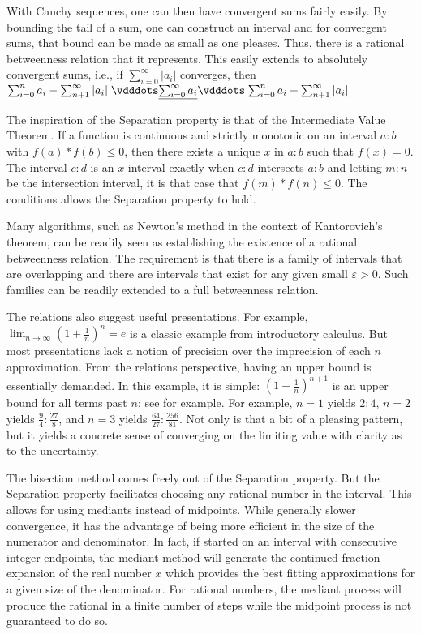 \documentclass[12pt]{article}
\begin{document}
With Cauchy sequences, one can then have convergent sums fairly easily. By bounding the tail of a sum, one can construct an interval and for convergent sums, that bound can be made as small as one pleases. Thus, there is a rational betweenness relation that it represents. This easily extends to absolutely convergent sums, i.e., if $ \sum_{i=0}^{\infty} |a_i|$ converges, then $\sum_{i=0}^n a_i - \sum_{n+1}^{\infty} |a_i| \xrel[\sum_{i=0}^{\infty} a_i] \sum_{i=0}^n a_i + \sum_{n+1}^{\infty} |a_i|$ 

The inspiration of the Separation property is that of the Intermediate Value Theorem. If a function is continuous and strictly monotonic on an interval $a:b$ with $f(a)*f(b) \leq 0$, then there exists a unique $x$ in $a:b$ such that $f(x) = 0$. The interval $c:d$ is an $x$-interval exactly when $c:d$ intersects $a:b$ and letting $m:n$ be the intersection interval, it is that case that $f(m)*f(n) \leq 0$. The conditions allows the Separation property to hold. 

Many algorithms, such as Newton's method in the context of Kantorovich's theorem, can be readily seen as establishing the existence of a rational betweenness relation. The requirement is that there is a family of intervals that are overlapping and there are intervals that exist for any given small $\varepsilon>0$. Such families can be readily extended to a full betweenness relation. 

The relations also suggest useful presentations. For example, $\lim_{n \to \infty} (1+\frac{1}{n})^n = e$ is a classic example from introductory calculus. But most presentations lack a notion of precision over the imprecision of each $n$ approximation. From the relations perspective, having an upper bound is essentially demanded. In this example, it is simple: $(1 + \frac{1}{n})^{n+1}$ is an upper bound for all terms past $n$; see \cite{mend} for example. For example, $n=1$ yields $2:4$, $n=2$ yields $\frac{9}{4}:\frac{27}{8}$, and $n=3$ yields $\frac{64}{27}:\frac{256}{81}$. Not only is that a bit of a pleasing pattern, but it yields a concrete sense of converging on the limiting  value with clarity as to the uncertainty. 

The bisection method comes freely out of the Separation property. But the Separation property facilitates choosing any rational number in the interval. This allows for using mediants instead of midpoints. While generally slower convergence, it has the advantage of being more efficient in the size of the numerator and denominator. In fact, if started on an interval with consecutive integer endpoints, the mediant method will generate the continued fraction expansion of the real number $x$ which provides the best fitting approximations for a given size of the denominator. For rational numbers, the mediant process will produce the rational in a finite number of steps while the midpoint process is not guaranteed to do so. 
\end{document}
